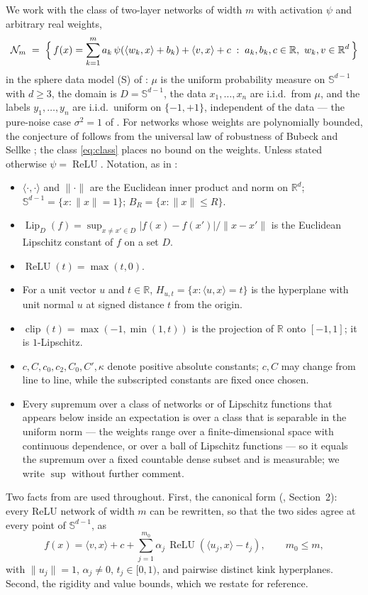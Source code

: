 \documentclass[11pt,reqno]{amsart}
\theoremstyle{plain}
\theoremstyle{definition}
\theoremstyle{remark}
\newcommand{\R}{\mathbb{R}}
\newcommand{\Sd}{\mathbb{S}^{d-1}}
\newcommand{\Lip}{\operatorname{Lip}}
\newcommand{\relu}{\operatorname{ReLU}}
\newcommand{\NN}{\mathcal{N}}
\newcommand{\inn}[2]{\langle #1,#2\rangle}
\DeclareMathOperator{\clip}{clip}
\begin{document}
We work with the class of two-layer networks of width $m$ with activation $\psi$ and arbitrary real weights,
\begin{equation}\label{eq:class}
\NN_m \;=\;\Bigl\{\,f(x)=\sum_{k=1}^{m}a_k\,\psi(\inn{w_k}{x}+b_k)+\inn{v}{x}+c\;:\;a_k,b_k,c\in\R,\ w_k,v\in\R^d\,\Bigr\}
\end{equation}
in the sphere data model (S) of \cite{BLN,paper}: $\mu$ is the uniform probability measure on $\Sd$ with $d\ge3$, the domain is $D=\Sd$, the data $x_1,\dots,x_n$ are i.i.d.\ from $\mu$, and the labels $y_1,\dots,y_n$ are i.i.d.\ uniform on $\{-1,+1\}$, independent of the data --- the pure-noise case $\sigma^2=1$ of \cite{paper}. For networks whose weights are polynomially bounded, the conjecture of \cite{BLN} follows from the universal law of robustness of Bubeck and Sellke \cite{BS}; the class \eqref{eq:class} places no bound on the weights. Unless stated otherwise $\psi=\relu$. Notation, as in \cite{paper}:
\begin{itemize}
\item $\inn{\cdot}{\cdot}$ and $\|\cdot\|$ are the Euclidean inner product and norm on $\R^d$; $\mathbb S^{d-1}=\{x:\|x\|=1\}$; $B_R=\{x:\|x\|\le R\}$.
\item $\Lip_D(f)=\sup_{x\ne x'\in D}|f(x)-f(x')|/\|x-x'\|$ is the Euclidean Lipschitz constant of $f$ on a set $D$.
\item $\relu(t)=\max(t,0)$.
\item For a unit vector $u$ and $t\in\R$, $H_{u,t}=\{x:\inn{u}{x}=t\}$ is the hyperplane with unit normal $u$ at signed distance $t$ from the origin.
\item $\clip(t)=\max(-1,\min(1,t))$ is the projection of $\R$ onto $[-1,1]$; it is $1$-Lipschitz.
\item $c,C,c_0,c_2,C_0,C',\kappa$ denote positive absolute constants; $c,C$ may change from line to line, while the subscripted constants are fixed once chosen.
\item Every supremum over a class of networks or of Lipschitz functions that appears below inside an expectation is over a class that is separable in the uniform norm --- the weights range over a finite-dimensional space with continuous dependence, or over a ball of Lipschitz functions --- so it equals the supremum over a fixed countable dense subset and is measurable; we write $\sup$ without further comment.
\end{itemize}

Two facts from \cite{paper} are used throughout. First, the canonical form (\cite{paper}, Section~2): every ReLU network of width $m$ can be rewritten, so that the two sides agree at every point of $\Sd$, as
\begin{equation}\label{eq:canon}
f(x)=\inn{v}{x}+c+\sum_{j=1}^{m_0}\alpha_j\,\relu(\inn{u_j}{x}-t_j),\qquad m_0\le m,
\end{equation}
with $\|u_j\|=1$, $\alpha_j\ne0$, $t_j\in[0,1)$, and pairwise distinct kink hyperplanes. Second, the rigidity and value bounds, which we restate for reference.
\end{document}
